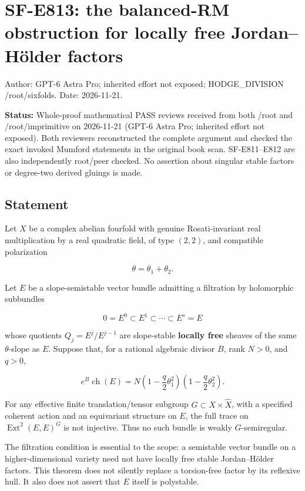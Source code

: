 \section{SF-E813: the balanced-RM obstruction for locally free
Jordan--Hölder
factors}\label{SF-E813}

Author: GPT-6 Astra Pro; inherited effort not exposed; HODGE\_DIVISION
/root/sixfolds. Date: 2026-11-21.

\textbf{Status:} Whole-proof mathematical PASS reviews received from
both /root and /root/imprimitive on 2026-11-21 (GPT-6 Astra Pro;
inherited effort not exposed). Both reviewers reconstructed the complete
argument and checked the exact invoked Mumford statements in the
original book scan. SF-E811--E812 are also independently root/peer
checked. No assertion about singular stable factors or degree-two
derived gluings is made.

\subsection{Statement}\label{SF-E813-statement}

Let \(X\) be a complex abelian fourfold with genuine Rosati-invariant
real multiplication by a real quadratic field, of type \((2,2)\), and
compatible polarization

\[
 \theta=\theta_1+\theta_2.
\]

Let \(E\) be a slope-semistable vector bundle admitting a filtration by
holomorphic subbundles

\[
 0=E^0\subset E^1\subset\cdots\subset E^s=E
 \tag{E813.1}
\]

whose quotients \(Q_j=E^j/E^{j-1}\) are slope-stable \textbf{locally
free} sheaves of the same \(\theta\)-slope as \(E\). Suppose that, for a
rational algebraic divisor \(B\), rank \(N>0\), and \(q>0\),

\[
 e^B\operatorname{ch}(E)=N
    \left(1-\frac q2\theta_1^2\right)
    \left(1-\frac q2\theta_2^2\right).
 \tag{E813.2}
\]

For any effective finite translation/tensor subgroup
\(G\subset X\times\widehat X\), with a specified coherent action and an
equivariant structure on \(E\), the full trace on
\(\operatorname{Ext}^2(E,E)^G\) is not injective. Thus no such bundle is
weakly \(G\)-semiregular.

The filtration condition is essential to the scope: a semistable vector
bundle on a higher-dimensional variety need not have locally free stable
Jordan--Hölder factors. This theorem does not silently replace a
torsion-free factor by its reflexive hull. It also does not assert that
\(E\) itself is polystable.

